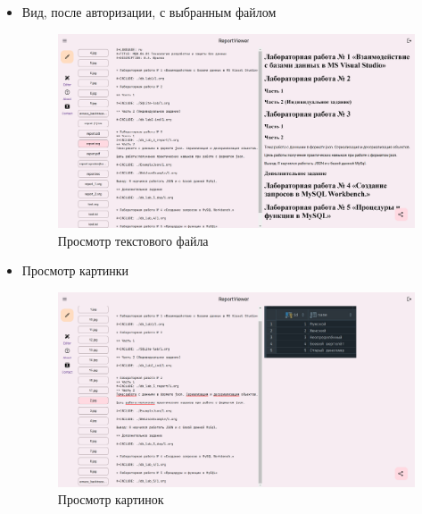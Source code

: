 \documentclass[14pt]{extarticle}
\begin{document}
\begin{itemize}
\begin{itemize}
\item Вид, после авторизации, с выбранным файлом
\begin{figure}[H]
\centering
\includegraphics[width=.9\linewidth]{images/2023-04-05_09-42-23_screenshot.png}
\caption{Просмотр текстового файла}
\end{figure}

\item Просмотр картинки
\begin{figure}[H]
\centering
\includegraphics[width=.9\linewidth]{images/2023-04-05_09-43-05_screenshot.png}
\caption{Просмотр картинок}
\end{figure}
\end{itemize}


\end{itemize}
\end{document}
